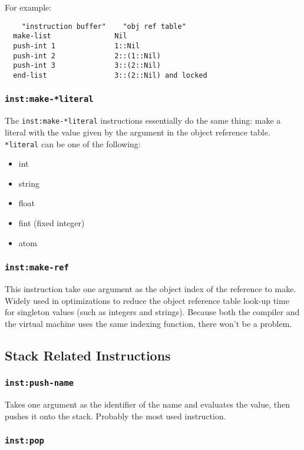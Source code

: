 \documentclass{article}
\newcommand{\inst}[1] {\texttt{inst:#1}}
\begin{document}
For example:
\begin{verbatim}
    "instruction buffer"    "obj ref table"
  make-list               Nil
  push-int 1              1::Nil
  push-int 2              2::(1::Nil)
  push-int 3              3::(2::Nil)
  end-list                3::(2::Nil) and locked
\end{verbatim}

\subsubsection{\inst{make-*literal}}

The \inst{make-*literal} instructions essentially do the same thing: make a literal with the value given by the argument in the object reference table. \texttt{*literal} can be one of the following:
\begin{itemize}
\item int
\item string
\item float
\item fint (fixed integer)
\item atom
\end{itemize}

\subsubsection{\inst{make-ref}}

This instruction take one argument as the object index of the reference to make. Widely used in optimizations to reduce the object reference table look-up time for singleton values (such as integers and strings). Because both the compiler and the virtual machine uses the same indexing function, there won't be a problem.

\subsection{Stack Related Instructions}

\subsubsection{\inst{push-name}}

Takes one argument as the identifier of the name and evaluates the value, then pushes it onto the stack. Probably the most used instruction.

\subsubsection{\inst{pop}}
\end{document}
